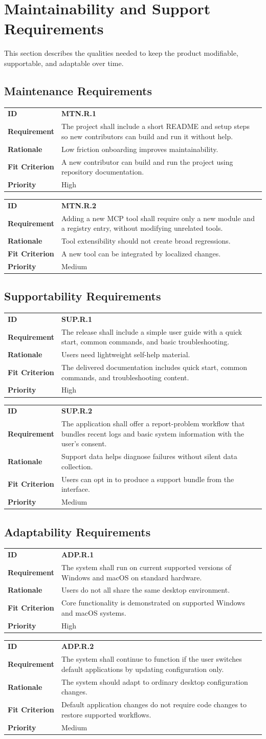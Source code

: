 \documentclass[12pt]{article}
\makeatletter
\newcommand{\reqcard}[5]{%
\noindent\begin{tabularx}{\textwidth}{@{}p{2.35cm}X@{}}
\textbf{ID} & \textbf{#1} \\
\textbf{Requirement} & #2 \\
\textbf{Rationale} & #3 \\
\textbf{Fit Criterion} & #4 \\
\textbf{Priority} & #5 \\
\end{tabularx}\par\medskip
}
\makeatother
\begin{document}
\section{Maintainability and Support Requirements}
This section describes the qualities needed to keep the product
modifiable, supportable, and adaptable over time.

\subsection{Maintenance Requirements}
\reqcard{MTN.R.1}{The project shall include a short README and setup
steps so new contributors can build and run it without help.}{Low
friction onboarding improves maintainability.}{A new contributor can
build and run the project using repository documentation.}{High}

\reqcard{MTN.R.2}{Adding a new MCP tool shall require only a new
module and a registry entry, without modifying unrelated
tools.}{Tool extensibility should not create broad
regressions.}{A new tool can be integrated by localized
changes.}{Medium}

\subsection{Supportability Requirements}
\reqcard{SUP.R.1}{The release shall include a simple user guide with
a quick start, common commands, and basic troubleshooting.}{Users need
lightweight self-help material.}{The delivered documentation includes
quick start, common commands, and troubleshooting content.}{High}

\reqcard{SUP.R.2}{The application shall offer a report-problem
workflow that bundles recent logs and basic system information with
the user's consent.}{Support data helps diagnose failures without
silent data collection.}{Users can opt in to produce a support bundle
from the interface.}{Medium}

\subsection{Adaptability Requirements}
\reqcard{ADP.R.1}{The system shall run on current supported versions
of Windows and macOS on standard hardware.}{Users do not all share the
same desktop environment.}{Core functionality is demonstrated on
supported Windows and macOS systems.}{High}

\reqcard{ADP.R.2}{The system shall continue to function if the user
switches default applications by updating configuration only.}{The
system should adapt to ordinary desktop configuration changes.}{Default
application changes do not require code changes to restore supported
workflows.}{Medium}
\end{document}
